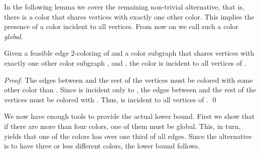 \documentclass[runningheads, a4paper]{llncs}
\begin{document}
In the following lemma we cover the remaining non-trivial alternative, that is, there is a color that shares vertices with exactly one other color. This implies the presence of a color incident to all vertices. From now on we call such a color \textit{global}.

\begin{lemma}\label{lemma:clique3}
Given a feasible edge 2-coloring of  and a color subgraph  that shares vertices with exactly one other color subgraph , and , the color  is incident to all vertices of .
\end{lemma}
\begin{proof}
The edges between  and the rest of the vertices must be colored with some other color than . Since  is incident only to , the edges between  and the rest of the vertices must be colored with . Thus,  is incident to all vertices of . \qed
\end{proof}

We now have enough tools to provide the actual lower bound. First we show that if there are more than four colors, one of them must be global. This, in turn, yields that one of the colors has over one third of all edges. Since the alternative is to have three or less different colors, the lower bound follows.
\end{document}
